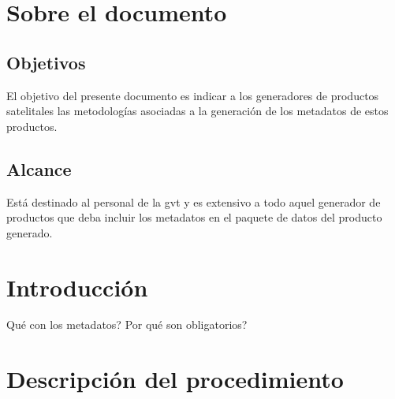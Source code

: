\documentclass{GVT_CONAE_Class}
\begin{document}
\section{Sobre el documento}

    \subsection{Objetivos}
    
    El objetivo del presente documento es indicar a los generadores de productos satelitales las metodologías asociadas a la generación de los metadatos de estos productos.

    \subsection{Alcance}
    Está destinado al personal de la \gls{gvt} y es extensivo a todo aquel generador de productos que deba incluir los metadatos en el paquete de datos del producto generado.
    
    \printglossary[type=\acronymtype, numberedsection, title=Lista de acrónimos y abreviaturas]


\section{Introducción}

Qué con los metadatos? Por qué son obligatorios? 

\section{Descripción del procedimiento}
\end{document}

